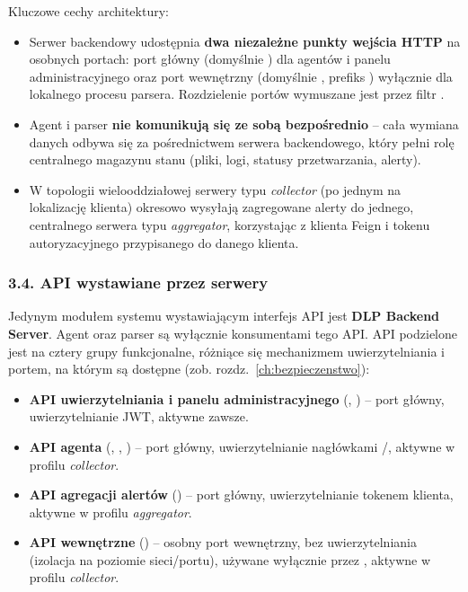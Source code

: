 \noindent Kluczowe cechy architektury:
\begin{itemize}
  \item Serwer backendowy udostępnia \textbf{dwa niezależne punkty wejścia HTTP} na osobnych
        portach: port główny (domyślnie ) dla agentów i panelu administracyjnego oraz
        port wewnętrzny (domyślnie , prefiks ) wyłącznie dla lokalnego
        procesu parsera. Rozdzielenie portów wymuszane jest przez filtr
        .
  \item Agent i parser \textbf{nie komunikują się ze sobą bezpośrednio} -- cała wymiana danych
        odbywa się za pośrednictwem serwera backendowego, który pełni rolę centralnego magazynu
        stanu (pliki, logi, statusy przetwarzania, alerty).
  \item W topologii wielooddziałowej serwery typu \emph{collector} (po jednym na lokalizację
        klienta) okresowo wysyłają zagregowane alerty do jednego, centralnego serwera typu
        \emph{aggregator}, korzystając z klienta Feign i tokenu autoryzacyjnego przypisanego do
        danego klienta.
\end{itemize}

\subsubsection*{3.4. API wystawiane przez serwery}
\label{sec:dlp-api}

Jedynym modułem systemu wystawiającym interfejs API jest \textbf{DLP Backend Server}. Agent oraz
parser są wyłącznie konsumentami tego API. API podzielone jest na cztery grupy funkcjonalne,
różniące się mechanizmem uwierzytelniania i portem, na którym są dostępne (zob. rozdz.~\ref{ch:bezpieczenstwo}):

\begin{itemize}
  \item \textbf{API uwierzytelniania i panelu administracyjnego} (, ) --
        port główny, uwierzytelnianie JWT, aktywne zawsze.
  \item \textbf{API agenta} (, , ) -- port główny, uwierzytelnianie
        nagłówkami /, aktywne w profilu \emph{collector}.
  \item \textbf{API agregacji alertów} () -- port główny, uwierzytelnianie tokenem
        klienta, aktywne w profilu \emph{aggregator}.
  \item \textbf{API wewnętrzne} () -- osobny port wewnętrzny, bez
        uwierzytelniania (izolacja na poziomie sieci/portu), używane wyłącznie przez
        , aktywne w profilu \emph{collector}.
\end{itemize}

